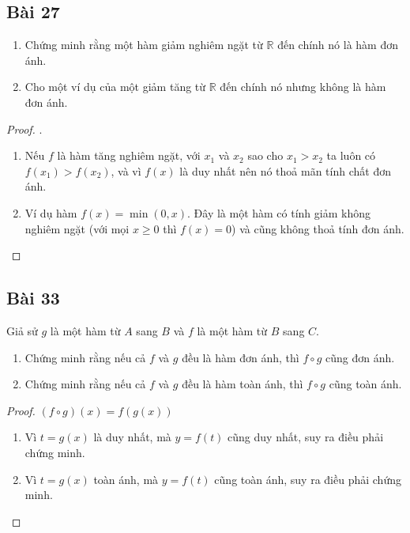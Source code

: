 \subsection*{Bài 27}
\begin{enumerate}[label=\alph*)]
    \item Chứng minh rằng một hàm giảm nghiêm ngặt từ $\mathbb{R}$ đến chính nó là hàm đơn ánh.
    \item Cho một ví dụ của một giảm tăng từ $\mathbb{R}$ đến chính nó nhưng không là hàm đơn ánh.
\end{enumerate}
\begin{proof}.
    \begin{enumerate}[label=\alph*)]
        \item Nếu $f$ là hàm tăng nghiêm ngặt, với $x_1$ và $x_2$ sao cho $x_1>x_2$ ta luôn có $f(x_1)>f(x_2)$, và vì $f(x)$ là duy nhất nên nó thoả mãn tính chất đơn ánh.
        \item Ví dụ hàm $f(x)=\min(0,x)$. Đây là một hàm có tính giảm không nghiêm ngặt (với mọi $x\geq0$ thì $f(x)=0$) và cũng không thoả tính đơn ánh.
    \end{enumerate}
\end{proof}
\subsection*{Bài 33}
Giả sử $g$ là một hàm từ $A$ sang $B$ và $f$ là một hàm từ $B$ sang $C$.
\begin{enumerate}[label=\alph*)]
    \item Chứng minh rằng nếu cả $f$ và $g$ đều là hàm đơn ánh, thì $f\circ g$ cũng đơn ánh.
    \item Chứng minh rằng nếu cả $f$ và $g$ đều là hàm toàn ánh, thì $f\circ g$ cũng toàn ánh.
\end{enumerate}
\begin{proof}
    $(f\circ g)(x)=f(g(x))$
    \begin{enumerate}[label=\alph*)]
        \item Vì $t=g(x)$ là duy nhất, mà $y=f(t)$ cũng duy nhất, suy ra điều phải chứng minh.
        \item Vì $t=g(x)$ toàn ánh, mà $y=f(t)$ cũng toàn ánh, suy ra điều phải chứng minh.
    \end{enumerate}
\end{proof}
